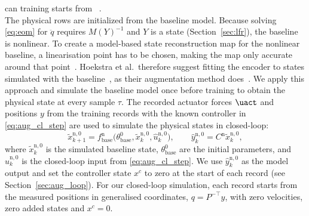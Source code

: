 \add[Jan41]{} can  training starts
from ~\cite[Sec.~5.4]{hoekstra2026lfr}.
\\
The physical rows are initialized from the baseline model.
Because solving \eqref{eq:eom} for $\ddot q$ requires $M(Y)^{-1}$ 
and $Y$ is a state (Section~\ref{sec:lfr}), the baseline is nonlinear.
To create a model-based state reconstruction map for the nonlinear baseline, 
a linearisation point has to be chosen, 
making the map only accurate around that 
point~\cite[Sec.~3.1]{hoekstra2026encoder}.
Hoekstra et al.\ therefore suggest fitting the encoder to 
states simulated with the 
baseline~\cite[Sec.~4.4, Eq.~(35)]{hoekstra2026encoder}, as their 
augmentation method does~\cite[Eq.~(30)]{hoekstra2026lfr}.
We apply this approach and simulate the baseline model once before training 
to obtain the physical state at every sample $\tau$.
The recorded actuator forces $\uact$ and positions $y$
from the training records with the known controller in
\eqref{eq:aug_cl_step} are used to simulate the physical states in closed-loop:
\begin{equation}
 \tilde x^{\mathrm n,0}_{k+1}=f^{\mathrm n}_{\mathrm{base}}\bigl(\theta^0_{\mathrm{base}},
   \tilde x^{\mathrm n,0}_k,\hat u^{\mathrm n,0}_k\bigr),\qquad
 \hat y^{\mathrm n,0}_k=C^{\mathrm n}\tilde x^{\mathrm n,0}_k,
 \label{eq:aug_enc_sim}
\end{equation}
where $\tilde x^{\mathrm n,0}_k$ is the simulated baseline state,
$\theta^0_{\mathrm{base}}$ are the initial parameters,
and $\hat u^{\mathrm n,0}_k$ is the closed-loop input
from \eqref{eq:aug_cl_step}.
We use $\hat y^{\mathrm n,0}_k$ as the model output
and set the controller state $x^c$ to zero at the 
start of each record (see Section~\ref{sec:aug_loop}).
For our closed-loop simulation, each record starts from the measured
positions in generalised coordinates, $q=P^{-\top}y$, with zero
velocities, zero added states and $x^c=0$.
